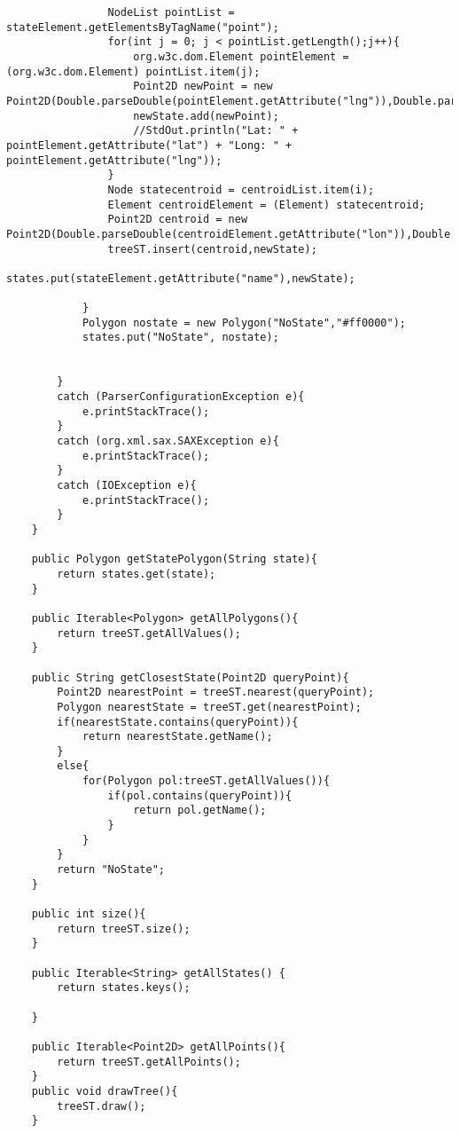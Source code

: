 \begin{verbatim}
                NodeList pointList = stateElement.getElementsByTagName("point");
                for(int j = 0; j < pointList.getLength();j++){
                    org.w3c.dom.Element pointElement = (org.w3c.dom.Element) pointList.item(j);
                    Point2D newPoint = new Point2D(Double.parseDouble(pointElement.getAttribute("lng")),Double.parseDouble(pointElement.getAttribute("lat")));
                    newState.add(newPoint);
                    //StdOut.println("Lat: " + pointElement.getAttribute("lat") + "Long: " + pointElement.getAttribute("lng"));
                }
                Node statecentroid = centroidList.item(i);
                Element centroidElement = (Element) statecentroid;
                Point2D centroid = new Point2D(Double.parseDouble(centroidElement.getAttribute("lon")),Double.parseDouble(centroidElement.getAttribute("lat")));
                treeST.insert(centroid,newState);
                states.put(stateElement.getAttribute("name"),newState);

            }
            Polygon nostate = new Polygon("NoState","#ff0000");
            states.put("NoState", nostate);


        }
        catch (ParserConfigurationException e){
            e.printStackTrace();
        }
        catch (org.xml.sax.SAXException e){
            e.printStackTrace();
        }
        catch (IOException e){
            e.printStackTrace();
        }
    }

    public Polygon getStatePolygon(String state){
        return states.get(state);
    }

    public Iterable<Polygon> getAllPolygons(){
        return treeST.getAllValues();
    }

    public String getClosestState(Point2D queryPoint){
        Point2D nearestPoint = treeST.nearest(queryPoint);
        Polygon nearestState = treeST.get(nearestPoint);
        if(nearestState.contains(queryPoint)){
            return nearestState.getName();
        }
        else{
            for(Polygon pol:treeST.getAllValues()){
                if(pol.contains(queryPoint)){
                    return pol.getName();
                }
            }
        }
        return "NoState";
    }

    public int size(){
        return treeST.size();
    }

    public Iterable<String> getAllStates() {
        return states.keys();

    }

    public Iterable<Point2D> getAllPoints(){
        return treeST.getAllPoints();
    }
    public void drawTree(){
        treeST.draw();
    }




\end{verbatim}
